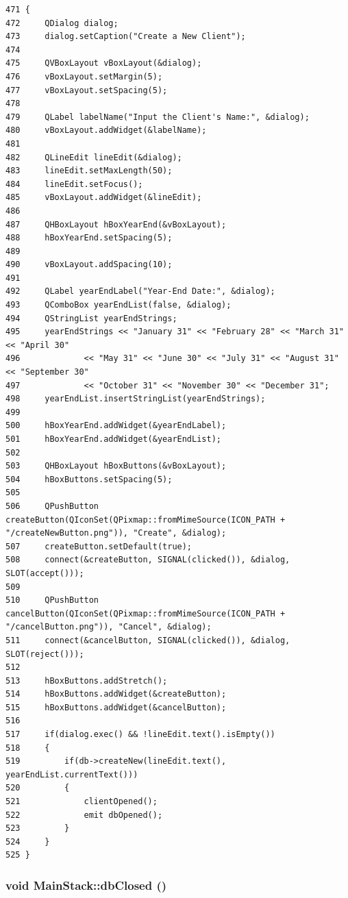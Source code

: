 \footnotesize\begin{verbatim}471 {
472     QDialog dialog;
473     dialog.setCaption("Create a New Client");
474     
475     QVBoxLayout vBoxLayout(&dialog);
476     vBoxLayout.setMargin(5);
477     vBoxLayout.setSpacing(5);
478     
479     QLabel labelName("Input the Client's Name:", &dialog);
480     vBoxLayout.addWidget(&labelName);
481     
482     QLineEdit lineEdit(&dialog);
483     lineEdit.setMaxLength(50);
484     lineEdit.setFocus();
485     vBoxLayout.addWidget(&lineEdit);
486     
487     QHBoxLayout hBoxYearEnd(&vBoxLayout);
488     hBoxYearEnd.setSpacing(5);
489 
490     vBoxLayout.addSpacing(10);
491     
492     QLabel yearEndLabel("Year-End Date:", &dialog);
493     QComboBox yearEndList(false, &dialog);
494     QStringList yearEndStrings;
495     yearEndStrings << "January 31" << "February 28" << "March 31" << "April 30"
496             << "May 31" << "June 30" << "July 31" << "August 31" << "September 30"
497             << "October 31" << "November 30" << "December 31";
498     yearEndList.insertStringList(yearEndStrings);
499     
500     hBoxYearEnd.addWidget(&yearEndLabel);
501     hBoxYearEnd.addWidget(&yearEndList);
502     
503     QHBoxLayout hBoxButtons(&vBoxLayout);
504     hBoxButtons.setSpacing(5);
505     
506     QPushButton createButton(QIconSet(QPixmap::fromMimeSource(ICON_PATH + "/createNewButton.png")), "Create", &dialog);
507     createButton.setDefault(true);
508     connect(&createButton, SIGNAL(clicked()), &dialog, SLOT(accept()));
509     
510     QPushButton cancelButton(QIconSet(QPixmap::fromMimeSource(ICON_PATH + "/cancelButton.png")), "Cancel", &dialog);
511     connect(&cancelButton, SIGNAL(clicked()), &dialog, SLOT(reject()));
512     
513     hBoxButtons.addStretch();
514     hBoxButtons.addWidget(&createButton);
515     hBoxButtons.addWidget(&cancelButton);
516     
517     if(dialog.exec() && !lineEdit.text().isEmpty())
518     {
519         if(db->createNew(lineEdit.text(), yearEndList.currentText()))
520         {
521             clientOpened();
522             emit dbOpened();
523         }
524     }
525 }
\end{verbatim}\normalsize 


\hypertarget{classMainStack_l4}{
\subsubsection[dbClosed]{\setlength{\rightskip}{0pt plus 5cm}void Main\-Stack::db\-Closed ()}}
\label{classMainStack_l4}




